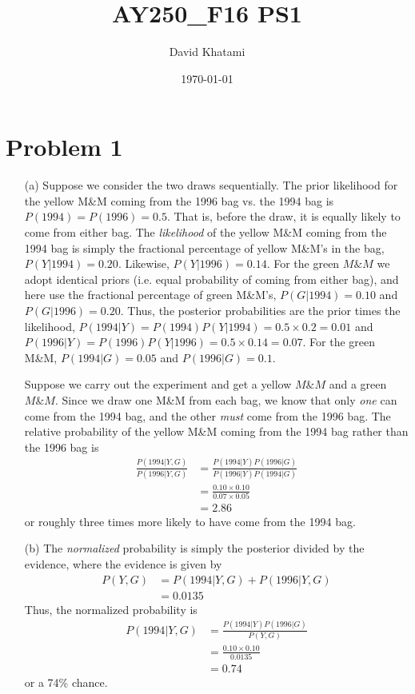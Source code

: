\documentclass[12pt,a4paper]{article}
\begin{document}
\title{AY250\_F16 PS1}
\author{David Khatami}
\date{\today}
\maketitle

\section*{Problem 1}
\begin{enumerate}
\item[(a)] Suppose we consider the two draws sequentially. The prior likelihood for the yellow M\&M coming from the 1996 bag vs. the 1994 bag is $P(1994)=P(1996)=0.5$. That is, before the draw, it is equally likely to come from either bag. The \textit{likelihood} of the yellow M\&M coming from the 1994 bag is simply the fractional percentage of yellow M\&M's in the bag, $P(Y|1994)=0.20$. Likewise, $P(Y|1996)=0.14$. For the green $M\&M$ we adopt identical priors (i.e. equal probability of coming from either bag), and here use the fractional percentage of green M\&M's, $P(G|1994)=0.10$ and $P(G|1996)=0.20$. Thus, the posterior probabilities are the prior times the likelihood, $P(1994|Y)=P(1994)P(Y|1994)=0.5\times0.2=0.01$ and $P(1996|Y)=P(1996)P(Y|1996)=0.5\times0.14=0.07$. For the green M\&M, $P(1994|G)=0.05$ and $P(1996|G)=0.1$.\par \indent
	 Suppose we carry out the experiment and get a yellow $M\&M$ and a green $M\&M$. Since we draw one M\&M from each bag, we know that only \textit{one} can come from the 1994 bag, and the other \textit{must} come from the 1996 bag. The relative probability of the yellow M\&M coming from the 1994 bag rather than the 1996 bag is
\begin{align}
\frac{P(1994|Y,G)}{P(1996|Y,G)}&=\frac{P(1994|Y)P(1996|G)}{P(1996|Y)P(1994|G)}\\
&=\frac{0.10\times0.10}{0.07\times0.05} \\
&=2.86
\end{align}
or roughly three times more likely to have come from the 1994 bag.
\item[(b)] The \textit{normalized} probability is simply the posterior divided by the evidence, where the evidence is given by
\begin{align}
P(Y,G)&=P(1994|Y,G)+P(1996|Y,G)\\
&= 0.0135
\end{align}
Thus, the normalized probability is
\begin{align}
P(1994|Y,G)&=\frac{P(1994|Y)P(1996|G)}{P(Y,G)}\\
&= \frac{0.10\times0.10}{0.0135}\\
&= 0.74
\end{align}
or a 74\% chance.
	 
\end{enumerate}
\end{document}
